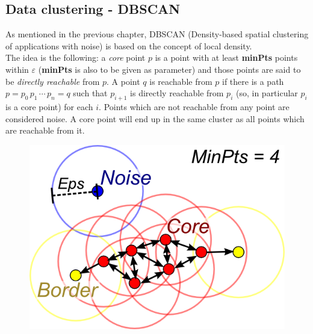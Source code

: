 \documentclass[a4paper,11pt]{book}
\begin{document}
\subsection{Data clustering - DBSCAN}
As mentioned in the previous chapter, DBSCAN (Density-based spatial clustering of applications with noise) is based on the concept of local density.\\
 The idea is the following: a \textit{core} point $p$ is a point with at least \textbf{minPts}  points within $\varepsilon$ (\textbf{minPts} is also to be given as parameter) and those points are said to be \textit{directly reachable} from $p$. A point $q$ is reachable from $p$ if there is a path $p=p_0\,p_1\,\cdots\,p_n=q$ such that $p_{i+1}$ is directly reachable from $p_i$ (so, in particular $p_i$ is a core point) for each $i$. Points which are not reachable from any point are considered noise. A core point will end up in the same cluster as all points which are reachable from it.
 \vspace{5mm}
 \begin{figure}
 \centering
\includegraphics[scale=1.2]{DBSCAN.png}
\end{figure}
\end{document}
